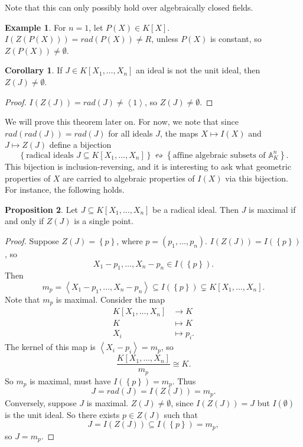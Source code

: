 \documentclass{article}
\newcommand{\A}{\mathbb{A}}
\newcommand{\rb}[1]{\left( #1 \right)}
\renewcommand{\sb}[1]{\left[ #1 \right]}
\newcommand{\cb}[1]{\left\{ #1 \right\}}
\newcommand{\ab}[1]{\left\langle #1 \right\rangle}
\theoremstyle{definition}\newtheorem{definition}{Definition}[subsection]
\theoremstyle{definition}\newtheorem{remark}[definition]{Remark}
\theoremstyle{definition}\newtheorem*{example}{Example}
\theoremstyle{definition}\newtheorem*{note}{Note}
\newtheorem{proposition}[definition]{Proposition}
\newtheorem{corollary}[definition]{Corollary}
\begin{document}
Note that this can only possibly hold over algebraically closed fields.

\begin{example}
For $ n = 1 $, let $ P\rb{X} \in K\sb{X} $. $ I\rb{Z\rb{P\rb{X}}} = rad\rb{P\rb{X}} \ne R $, unless $ P\rb{X} $ is constant, so $ Z\rb{P\rb{X}} \ne \emptyset $.
\end{example}

\begin{corollary}
If $ J \in K\sb{X_1, \dots, X_n} $ an ideal is not the unit ideal, then $ Z\rb{J} \ne \emptyset $.
\end{corollary}

\begin{proof}
$ I\rb{Z\rb{J}} = rad\rb{J} \ne \ab{1} $, so $ Z\rb{J} \ne \emptyset $.
\end{proof}


We will prove this theorem later on. For now, we note that since $ rad\rb{rad\rb{J}} = rad\rb{J} $ for all ideals $ J $, the maps $ X \mapsto I\rb{X} $ and $ J \mapsto Z\rb{J} $ define a bijection
$$ \cb{\text{radical ideals } J \subseteq K\sb{X_1, \dots, X_n}} \leftrightsquigarrow \cb{\text{affine algebraic subsets of } \A_K^n}. $$
This bijection is inclusion-reversing, and it is interesting to ask what geometric properties of $ X $ are carried to algebraic properties of $ I\rb{X} $ via this bijection. For instance, the following holds.

\begin{proposition}
Let $ J \subseteq K\sb{X_1, \dots, X_n} $ be a radical ideal. Then $ J $ is maximal if and only if $ Z\rb{J} $ is a single point.
\end{proposition}

\begin{proof}
Suppose $ Z\rb{J} = \cb{p} $, where $ p = \rb{p_1, \dots, p_n} $. $ I\rb{Z\rb{J}} = I\rb{\cb{p}} $, so
$$ X_1 - p_1, \dots, X_n - p_n \in I\rb{\cb{p}}. $$
Then
$$ m_p = \ab{X_1 - p_1, \dots, X_n - p_n} \subseteq I\rb{\cb{p}} \subsetneq K\sb{X_1, \dots, X_n}. $$
Note that $ m_p $ is maximal. Consider the map
\begin{align*}
K\sb{X_1, \dots, X_n} & \to K \\
K & \mapsto K \\
X_i & \mapsto p_i.
\end{align*}
The kernel of this map is $ \ab{X_i - p_i} = m_p $, so
$$ \dfrac{K\sb{X_1, \dots, X_n}}{m_p} \cong K. $$
So $ m_p $ is maximal, must have $ I\rb{\cb{p}} = m_p $. Thus
$$ J = rad\rb{J} = I\rb{Z\rb{J}} = m_p. $$
Conversely, suppose $ J $ is maximal. $ Z\rb{J} \ne \emptyset $, since $ I\rb{Z\rb{J}} = J $ but $ I\rb{\emptyset} $ is the unit ideal. So there exists $ p \in Z\rb{J} $ such that
$$ J = I\rb{Z\rb{J}} \subseteq I\rb{\cb{p}} = m_p, $$
so $ J = m_p $.
\end{proof}
\end{document}
